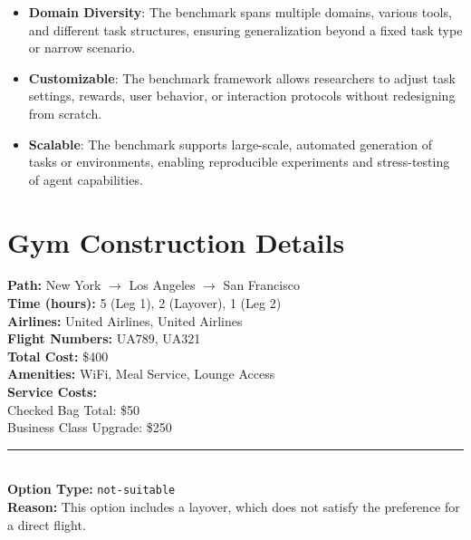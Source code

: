 \begin{itemize}[topsep=2pt, partopsep=-3pt, leftmargin=8pt, itemsep=-3pt]
  \item \textbf{Domain Diversity}: The benchmark spans multiple domains, various tools, and different task structures, ensuring generalization beyond a fixed task type or narrow scenario.
  
  \item \textbf{Customizable}: The benchmark framework allows researchers to adjust task settings, rewards, user behavior, or interaction protocols without redesigning from scratch.

  \item \textbf{Scalable}: The benchmark supports large-scale, automated generation of tasks or environments, enabling reproducible experiments and stress-testing of agent capabilities.
\end{itemize}


\section{Gym Construction Details}
\label{sec:apdx_construction}

{\small
\begin{tcolorbox}[colback=gray!5!white, colframe=black!75!black, 
title=Wrong Option Example: Flight Option F2, boxrule=0.3mm, width=0.48\textwidth, arc=3mm, auto outer arc=true]

\textbf{Path:} New York $\rightarrow$ Los Angeles $\rightarrow$ San Francisco \\
\textbf{Time (hours):} 5 (Leg 1), 2 (Layover), 1 (Leg 2) \\
\textbf{Airlines:} United Airlines, United Airlines \\
\textbf{Flight Numbers:} UA789, UA321 \\
\textbf{Total Cost:} \$400 \\
\textbf{Amenities:} WiFi, Meal Service, Lounge Access \\
\textbf{Service Costs:} \\
\hspace*{4mm}Checked Bag Total: \$50 \\
\hspace*{4mm}Business Class Upgrade: \$250 \\
\rule{\linewidth}{0.2pt} \\[2mm]
\textbf{Option Type:} \texttt{not-suitable} \\
\textbf{Reason:} This option includes a layover, which does not satisfy the preference for a direct flight.
\end{tcolorbox}
}

